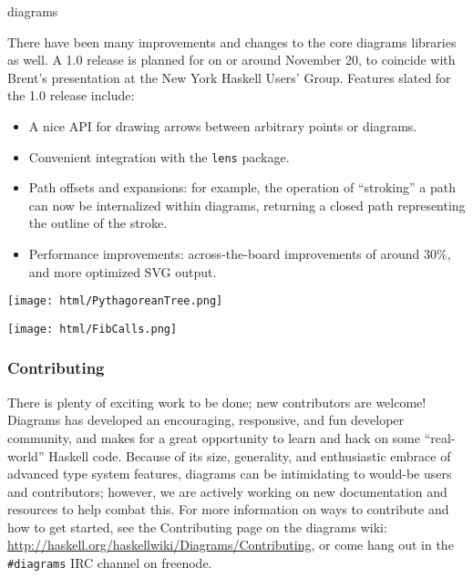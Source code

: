 \begin{hcarentry}[updated]{diagrams}

There have been many improvements and changes to the core
diagrams libraries as well.  A 1.0 release is planned for on or around
November 20, to coincide with Brent's presentation at the New York
Haskell Users' Group.  Features slated for the 1.0 release
include:
\begin{itemize}
\item A nice API for drawing arrows between arbitrary points or diagrams.
\item Convenient integration with the \texttt{lens} package.
\item Path offsets and expansions: for example, the operation of
  ``stroking'' a path can now be internalized within diagrams,
  returning a closed path representing the outline of the stroke.
\item Performance improvements: across-the-board improvements of
  around 30\%, and more optimized SVG output.
\end{itemize}

\begin{center}
\texttt{[image: html/PythagoreanTree.png]}
\end{center}


\begin{center}
\texttt{[image: html/FibCalls.png]}
\end{center}

\subsubsection*{Contributing}

There is plenty of exciting work to be done; new contributors are
welcome!  Diagrams has developed an encouraging, responsive, and fun
developer community, and makes for a great opportunity to learn and
hack on some ``real-world'' Haskell code.  Because of its size,
generality, and enthusiastic embrace of advanced type system features,
diagrams can be intimidating to would-be users and contributors;
however, we are actively working on new documentation and resources to
help combat this.  For more information on ways to contribute and how
to get started, see the Contributing page on the diagrams wiki:
\url{http://haskell.org/haskellwiki/Diagrams/Contributing}, or come
hang out in the \texttt{\#diagrams} IRC channel on freenode.


\end{hcarentry}
